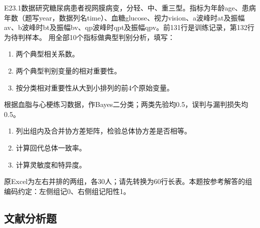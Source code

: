 \par\addvspace{6pt}\noindent\begin{minipage}{\linewidth}


E23.1数据研究糖尿病患者视网膜病变，分轻、中、重三型。指标为年龄age、患病年数（题写year，数据列名time）、血糖glucose、视力vision、a波峰时at及振幅av、b波峰时bt及振幅bv、qp波峰时qpt及振幅qpv。前131行是训练记录，第132行为待判样本。 用全部10个指标做典型判别分析，填写：

\begin{enumerate}
\def\labelenumi{\arabic{enumi}.}
\tightlist
\item
  两个典型相关系数。
\item
  两个典型判别变量的相对重要性。
\item
  按分类相对重要性从大到小排列的前4个原始变量。
\end{enumerate}



\end{minipage}\par\vspace{4pt}

\par\addvspace{6pt}\noindent\begin{minipage}{\linewidth}


根据血脂与心梗练习数据，作Bayes二分类；两类先验均0.5，误判与漏判损失均0.5。

\begin{enumerate}
\def\labelenumi{\arabic{enumi}.}
\tightlist
\item
  列出组内及合并协方差矩阵，检验总体协方差是否相等。
\item
  计算回代总体一致率。
\item
  计算灵敏度和特异度。
\end{enumerate}

原Excel为左右并排的两组，各30人；请先转换为60行长表。本题按参考解答的组编码约定：左侧组记0、右侧组记阳性1。



\end{minipage}\par\vspace{4pt}

\subsection{文献分析题}

